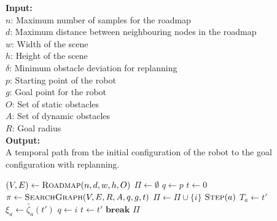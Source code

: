 \documentclass[letterpaper, 10pt, conference]{ieeeconf}
\renewcommand{\algorithmicrequire}{\textbf{Input:}}
\renewcommand{\algorithmicensure}{\textbf{Output:}}
\newcommand{\Function}[1]{\ensuremath{{ \textsc{#1}}}}
\begin{document}
\begin{algorithm}[ht]
    \caption{$\Function{Dodger}(n, d, w, h, \delta, p, g, O, A, R)$}
    \algorithmicrequire{
        \\$n$: Maximum number of samples for the roadmap
        \\$d$: Maximum distance between neighbouring nodes in the roadmap
        \\$w$: Width of the scene
        \\$h$: Height of the scene
        \\$\delta$: Minimum obstacle deviation for replanning
        \\$p$: Starting point of the robot
        \\$g$: Goal point for the robot
        \\$O$: Set of static obstacles
        \\$A$: Set of dynamic obstacles
        \\$R$: Goal radius
    }
    \\\algorithmicensure{
        \\A temporal path from the initial configuration of the robot
        to the goal configuration with replanning.
    }

    \label{algo:path}
    \begin{algorithmic}[1]
        \setcounter{ALC@line}{0}
        \STATE $(V, E) \leftarrow \Function{Roadmap}(n, d, w, h, O)$
        \STATE $\Pi \leftarrow \emptyset$
        \STATE $q \leftarrow p$
        \STATE $t \leftarrow 0$
        \WHILE {$||\Function{Back}(\Pi) - g||_2 > R$}
            \STATE $\pi \leftarrow \Function{SearchGraph}(V, E, R, A, q, g, t)$
                \STATE $\Pi \leftarrow \Pi \cup \{i\}$
                    \STATE $\Function{Step}(a)$
                \ENDFOR
                        \STATE $T_a \leftarrow t'$
                        \STATE $\xi_a \leftarrow \tilde{\zeta_a}(t')$
                    \ENDFOR
                    \STATE $q \leftarrow i$
                    \STATE $t \leftarrow t'$
                    \STATE $\textbf{break}$
                \ENDIF
            \ENDFOR
        \ENDWHILE
        \RETURN $\Pi$
    \end{algorithmic}
\end{algorithm}
\end{document}
